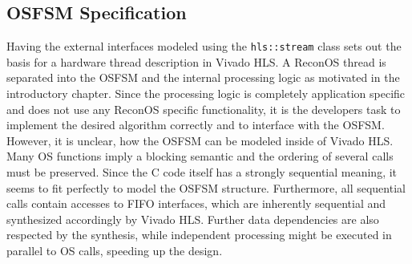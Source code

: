 \subsection{\acs{OSFSM} Specification}
Having the external interfaces modeled using the \lstinline{hls::stream}
class sets out the basis for a hardware thread description in Vivado HLS. A
ReconOS thread is separated into the \ac{OSFSM} and the internal processing
logic as motivated in the introductory chapter. Since the processing logic is
completely application specific and does not use any ReconOS specific
functionality, it is the developers task to implement the desired algorithm
correctly and to interface with the \ac{OSFSM}. However, it is unclear, how
the \ac{OSFSM} can be modeled inside of Vivado HLS. Many \ac{OS} functions
imply a blocking semantic and the ordering of several calls must be preserved.
Since the C code itself has a strongly sequential meaning, it seems to fit
perfectly to model the \ac{OSFSM} structure. Furthermore, all sequential calls
contain accesses to \ac{FIFO} interfaces, which are inherently sequential and
synthesized accordingly by Vivado HLS. Further data dependencies are also
respected by the synthesis, while independent processing might be executed in
parallel to \ac{OS} calls, speeding up the design.

